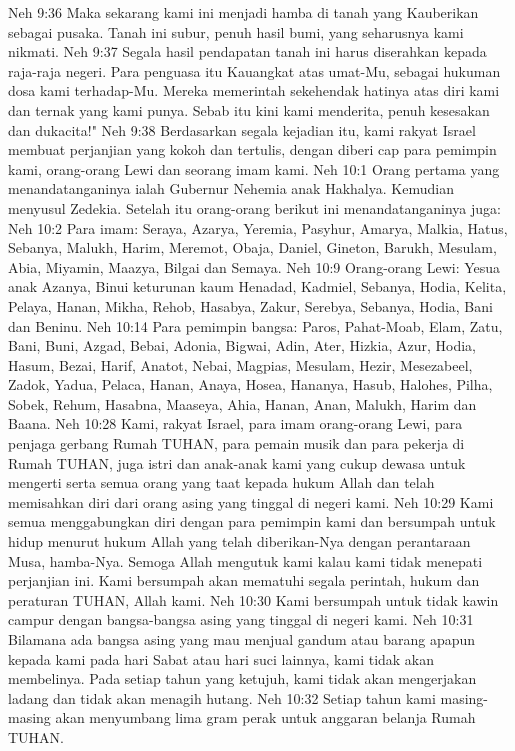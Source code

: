 Neh 9:36  Maka sekarang kami ini menjadi hamba di tanah yang Kauberikan sebagai pusaka. Tanah ini subur, penuh hasil bumi, yang seharusnya kami nikmati.
Neh 9:37  Segala hasil pendapatan tanah ini harus diserahkan kepada raja-raja negeri. Para penguasa itu Kauangkat atas umat-Mu, sebagai hukuman dosa kami terhadap-Mu. Mereka memerintah sekehendak hatinya atas diri kami dan ternak yang kami punya. Sebab itu kini kami menderita, penuh kesesakan dan dukacita!"
Neh 9:38  Berdasarkan segala kejadian itu, kami rakyat Israel membuat perjanjian yang kokoh dan tertulis, dengan diberi cap para pemimpin kami, orang-orang Lewi dan seorang imam kami.
Neh 10:1  Orang pertama yang menandatanganinya ialah Gubernur Nehemia anak Hakhalya. Kemudian menyusul Zedekia. Setelah itu orang-orang berikut ini menandatanganinya juga:
Neh 10:2  Para imam: Seraya, Azarya, Yeremia, Pasyhur, Amarya, Malkia, Hatus, Sebanya, Malukh, Harim, Meremot, Obaja, Daniel, Gineton, Barukh, Mesulam, Abia, Miyamin, Maazya, Bilgai dan Semaya.
Neh 10:9  Orang-orang Lewi: Yesua anak Azanya, Binui keturunan kaum Henadad, Kadmiel, Sebanya, Hodia, Kelita, Pelaya, Hanan, Mikha, Rehob, Hasabya, Zakur, Serebya, Sebanya, Hodia, Bani dan Beninu.
Neh 10:14  Para pemimpin bangsa: Paros, Pahat-Moab, Elam, Zatu, Bani, Buni, Azgad, Bebai, Adonia, Bigwai, Adin, Ater, Hizkia, Azur, Hodia, Hasum, Bezai, Harif, Anatot, Nebai, Magpias, Mesulam, Hezir, Mesezabeel, Zadok, Yadua, Pelaca, Hanan, Anaya, Hosea, Hananya, Hasub, Halohes, Pilha, Sobek, Rehum, Hasabna, Maaseya, Ahia, Hanan, Anan, Malukh, Harim dan Baana.
Neh 10:28  Kami, rakyat Israel, para imam orang-orang Lewi, para penjaga gerbang Rumah TUHAN, para pemain musik dan para pekerja di Rumah TUHAN, juga istri dan anak-anak kami yang cukup dewasa untuk mengerti serta semua orang yang taat kepada hukum Allah dan telah memisahkan diri dari orang asing yang tinggal di negeri kami.
Neh 10:29  Kami semua menggabungkan diri dengan para pemimpin kami dan bersumpah untuk hidup menurut hukum Allah yang telah diberikan-Nya dengan perantaraan Musa, hamba-Nya. Semoga Allah mengutuk kami kalau kami tidak menepati perjanjian ini. Kami bersumpah akan mematuhi segala perintah, hukum dan peraturan TUHAN, Allah kami.
Neh 10:30  Kami bersumpah untuk tidak kawin campur dengan bangsa-bangsa asing yang tinggal di negeri kami.
Neh 10:31  Bilamana ada bangsa asing yang mau menjual gandum atau barang apapun kepada kami pada hari Sabat atau hari suci lainnya, kami tidak akan membelinya. Pada setiap tahun yang ketujuh, kami tidak akan mengerjakan ladang dan tidak akan menagih hutang.
Neh 10:32  Setiap tahun kami masing-masing akan menyumbang lima gram perak untuk anggaran belanja Rumah TUHAN.
